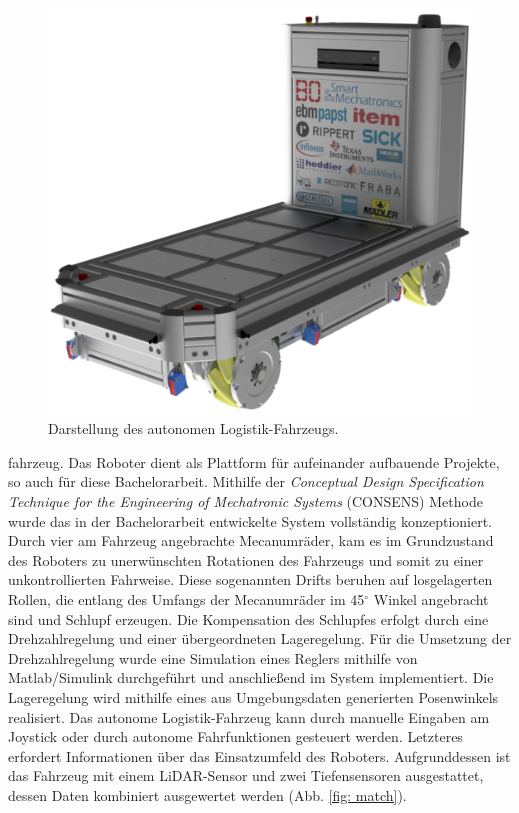 \documentclass[12pt,a4paper,oneside,numbers=noenddot,headsepline,captions=tableheading,toc=bibliography,openany]{article}
\begin{document}
\begin{titlepage}
\begin{figure}
	\includegraphics[width=0.5\columnwidth]{alf2}
	\caption{Darstellung des autonomen Logistik-Fahrzeugs.}
	\label{fig: alf}
\end{figure}

 fahrzeug. Das Roboter dient als Plattform für aufeinander aufbauende Projekte, so auch für diese Bachelorarbeit. Mithilfe der \textit{Conceptual Design Specification Technique for the Engineering of Mechatronic Systems} (CONSENS) Methode wurde das in der Bachelorarbeit entwickelte System vollständig konzeptioniert. Durch vier am Fahrzeug angebrachte Mecanumräder, kam es im Grundzustand des Roboters zu unerwünschten Rotationen des Fahrzeugs und somit zu einer unkontrollierten Fahrweise. Diese sogenannten Drifts beruhen auf losgelagerten Rollen, die entlang des Umfangs der Mecanumräder im 45$^\circ$ Winkel angebracht sind und Schlupf erzeugen. Die Kompensation des Schlupfes erfolgt durch eine Drehzahlregelung und einer übergeordneten Lageregelung. Für die Umsetzung der Drehzahlregelung wurde eine Simulation eines Reglers mithilfe von Matlab/Simulink durchgeführt und anschließend im System implementiert. Die Lageregelung wird mithilfe eines aus Umgebungsdaten generierten Posenwinkels realisiert. Das autonome Logistik-Fahrzeug kann durch manuelle Eingaben am Joystick oder durch autonome Fahrfunktionen gesteuert werden. Letzteres erfordert Informationen über das Einsatzumfeld des Roboters. Aufgrunddessen ist das Fahrzeug mit einem LiDAR-Sensor und zwei Tiefensensoren ausgestattet, dessen Daten kombiniert ausgewertet werden (Abb. \ref{fig: match}).


\end{titlepage}
\end{document}
